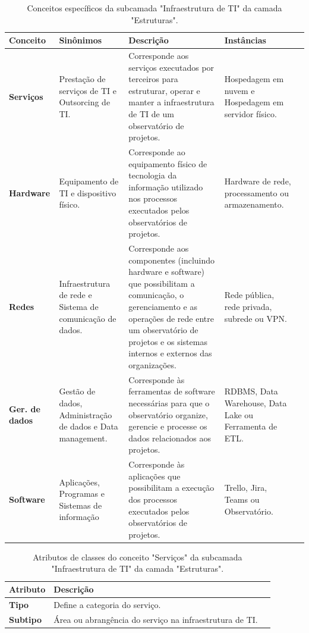 \begin{apendicesenv}
\begin{table}[H]
\centering
\caption{Conceitos específicos da subcamada "Infraestrutura de TI" da camada "Estruturas".}
\begin{tabularx}{\textwidth}{|l|X|X|X|X|}
\hline
\textbf{Conceito} & \textbf{Sinônimos} & \textbf{Descrição} & \textbf{Instâncias} \\ \hline
\textbf{Serviços}  & Prestação de serviços de TI e Outsorcing de TI. & Corresponde aos serviços executados por terceiros para estruturar, operar e manter a infraestrutura de TI de um observatório de projetos.& Hospedagem em nuvem e Hospedagem em servidor físico. \\ \hline
\textbf{Hardware}   & Equipamento de TI e dispositivo físico. & Corresponde ao equipamento físico de tecnologia da informação utilizado nos processos executados pelos observatórios de projetos. & Hardware de rede, processamento ou armazenamento. \\ \hline
\textbf{Redes}   & Infraestrutura de rede e Sistema de comunicação de dados. & Corresponde aos componentes (incluindo hardware e software) que possibilitam a comunicação, o gerenciamento e as operações de rede entre um observatório de projetos e os sistemas internos e externos das organizações. & Rede pública, rede privada, subrede ou VPN. \\ \hline
\textbf{Ger. de dados}   & Gestão de dados, Administração de dados e Data management.& Corresponde às ferramentas de software necessárias para que o observatório organize, gerencie e processe os dados relacionados aos projetos. & RDBMS, Data Warehouse, Data Lake ou Ferramenta de ETL. \\ \hline
\textbf{Software}  & Aplicações, Programas e Sistemas de informação & Corresponde às aplicações que possibilitam a execução dos processos executados pelos observatórios de projetos. & Trello, Jira, Teams ou Observatório. \\ \hline
\end{tabularx}
\end{table}

\begin{table}[H]
\centering
\caption{Atributos de classes do conceito "Serviços" da subcamada "Infraestrutura de TI" da camada "Estruturas".}
\begin{tabularx}{\textwidth}{|l|X|X|}
\hline
\textbf{Atributo} & \textbf{Descrição} \\ \hline
\textbf{Tipo}  & Define a categoria do serviço. \\ \hline
\textbf{Subtipo} & Área ou abrangência do serviço na infraestrutura de TI. \\ \hline
\end{tabularx}
\end{table}


\end{apendicesenv}
